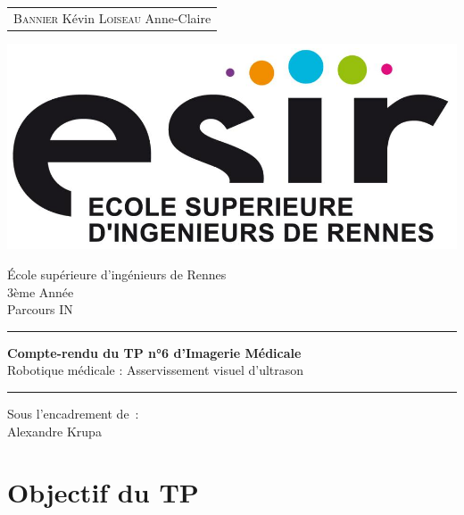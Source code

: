 \documentclass[a4paper,11pt]{article}
\begin{document}
\begin{titlepage}
    \vspace{-20px}
    \begin{tabular}{l}
	\textsc{Bannier} K\'evin
        \textsc{Loiseau} Anne-Claire
    \end{tabular}
    \hfill \vspace{10px}\includegraphics[scale=0.1]{./esir.png}\\
    \vfill
    \begin{center}
        \Huge{\'Ecole sup\'erieure d'ing\'enieurs de Rennes}\\
        \vspace{1cm}
        \LARGE{3\`eme Ann\'ee}\\
        \large{Parcours IN}\\
        \vspace{0.5cm}\hrule\vspace{0.5cm}
        \LARGE{\textbf{Compte-rendu du TP n°6 d'Imagerie M\'edicale}}\\
        \Large{Robotique m\'edicale : Asservissement visuel d'ultrason}
        \vspace{0.5cm}\hrule
        \vfill
        \vfill
    \end{center}
    \begin{flushleft}
        \Large{Sous l'encadrement de~:}\\
        \vspace{0.2cm}
        \large{{Alexandre} Krupa}
    \end{flushleft}
    \vfill
\end{titlepage}



\section{Objectif du TP}
\end{document}
